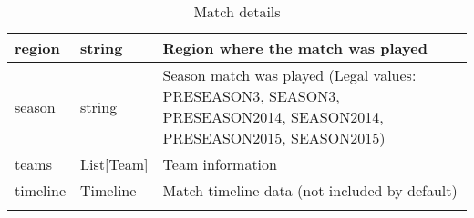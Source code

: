 \begin{longtable}{|llp{5cm}|}
region                & string                        & Region where the match was played                                                                                                                                                                                                                                                                                                                                                                                                                                                                                                                                                                                                       \\ \hline
season                & string                        & Season match was played (Legal values: PRESEASON3, SEASON3, PRESEASON2014, SEASON2014, PRESEASON2015, SEASON2015)                                                                                                                                                                                                                                                                                                                                                                                                                                                                                                                       \\ \hline
teams                 & List{[}Team{]}                & Team information                                                                                                                                                                                                                                                                                                                                                                                                                                                                                                                                                                                                                        \\ \hline
timeline              & Timeline                      & Match timeline data (not included by default)                                                                                                                                                                                                                                                                                                                                                                                                                                                                                                                                                                                           \\ \hline
\caption{Match details}\label{tab:match}
\end{longtable}


